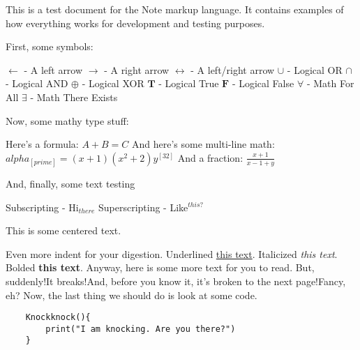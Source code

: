 \documentclass[12pt]{article}
\begin{document}
This is a test document for the Note markup language. It contains examples of how everything works for development and testing purposes.

First, some symbols:
\begin{adjustwidth}{4em}{0em}
    $\leftarrow$ - A left arrow \newline
    $\rightarrow$ - A right arrow \newline
    $\leftrightarrow$ - A left/right arrow \newline
    $\cup$ - Logical OR \newline
    $\cap$ - Logical AND \newline
    $\oplus$ - Logical XOR \newline
    $\mathbf{T}$ - Logical True \newline
    $\mathbf{F}$ - Logical False \newline
    $\forall$ - Math For All \newline
    $\exists$ - Math There Exists \newline
\end{adjustwidth}

Now, some mathy type stuff:
\begin{adjustwidth}{4em}{0em}
    Here's a formula: $ A+B=C $ \newline
    And here's some multi-line math:
    $
        alpha_[prime] = (x+1)(x^2+2)y^[32]
    $
    And a fraction: $\frac{x+1}{x-1+y}$  \newline
\end{adjustwidth}

And, finally, some text testing
\begin{adjustwidth}{4em}{0em}
    Subscripting - Hi$_{there}$ \newline
    Superscripting - Like$^{this?}$ \newline
    \begin{center}
    This is some centered text. \newline
    \end{center}
    \hspace{4em} Even more indent for your digestion. \newline
    Underlined \underline{this text}.\newline
    Italicized \textit{this text}.\newline
    Bolded \textbf{this text}.\newline
    Anyway, here is some more text for you to read. But, suddenly!\newline It breaks!And, before you know it, 
    \clearpage
    it's broken to the next page!Fancy, eh?
    Now, the last thing we should do is look at some code.
    \begin{verbatim}
    Knockknock(){
        print("I am knocking. Are you there?")
    }
    \end{verbatim}
\end{adjustwidth}
\end{document}
